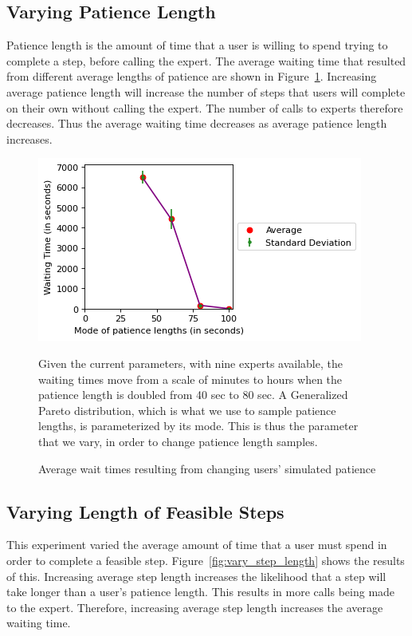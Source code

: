 \subsection{Varying Patience Length}

Patience length is the amount of time that a user is willing to spend trying to
complete a step, before calling the expert.
The average waiting time that resulted from different average lengths of
patience are shown in Figure~\ref{fig:vary_patience}.
Increasing average patience length will increase the number of steps that users
will complete on their own without calling the expert.
The number of calls to experts therefore decreases.
Thus the average waiting time decreases as average patience length increases.

\begin{figure}[h]
  \includegraphics{figures/montecarlo/vary_patience.png}
  \begin{captiontext}
    Given the current parameters, with nine experts available, the waiting times
    move from a scale of minutes to hours when the patience length is doubled
    from 40 sec to 80 sec.
    A Generalized Pareto distribution, which is what we use to sample patience
    lengths, is parameterized by its mode.
    This is thus the parameter that we vary, in order to change patience length
    samples.
  \end{captiontext}
  \caption{
    Average wait times resulting from changing users' simulated patience
  }\label{fig:vary_patience}
\end{figure}

\subsection{Varying Length of Feasible Steps}

This experiment varied the average amount of time that a user must spend in
order to complete a feasible step.
Figure~\ref{fig:vary_step_length} shows the results of this.
Increasing average step length increases the likelihood that a step will take
longer than a user's patience length.
This results in more calls being made to the expert.
Therefore, increasing average step length increases the average waiting time.

